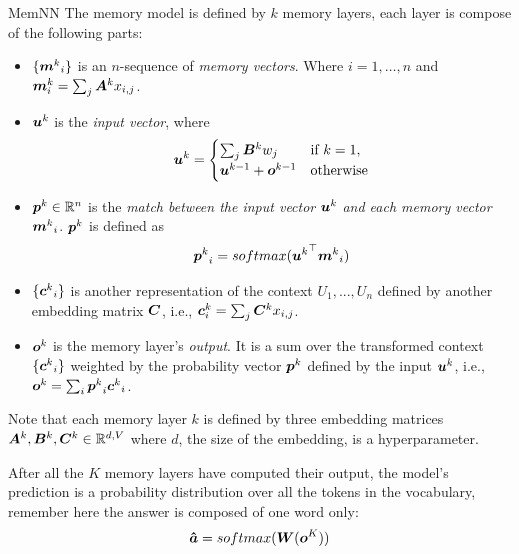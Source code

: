 \documentclass[10pt]{beamer}
\begin{document}
\begin{frame}{MemNN}
The memory model is defined by $k$ memory layers, each layer is compose of the following parts:


\begin{itemize}
\item $\{ {\bm{m}^{k}}_i\}$ is an $n$-sequence of \textit{memory vectors}. Where $i = 1, \dots, n$ and $\bm{m}^{k}_i = \sum_{j} \bm{A}^{k}x_{i,j}$.
\item  $\bm{u}^{k}$ is the \textit{input vector}, where
\begin{equation}
\bm{u}^{k}=
\begin{cases}
\sum_{j} \bm{B}^{k}w_{j} & \text{if } k=1, \\
\bm{u}^{k-1} + \bm{o}^{k-1}  & \text{otherwise}\\
\end{cases}
\end{equation}
\item $\bm{p}^{k} \in \mathbb{R}^{n}$ is the \textit{match between the input vector} $\bm{u}^{k}$ \textit{and each memory vector} ${\bm{m}^{k}}_i$. $\bm{p}^{k}$ is defined as
\begin{equation}
{\bm{p}^{k}}_i = softmax({\bm{u}^{k}}^{\top} {\bm{m}^{k}}_i) 
\end{equation}
\item $\{ {\bm{c}^{k}}_i\}$ is another representation of the context $U_1, ..., U_n$ defined by another embedding matrix $\bm{C}$, i.e., $\bm{c}^{k}_i = \sum_{j} \bm{C}^{k}x_{i,j}$.
\item $\bm{o}^{k}$ is the memory layer's  \textit{output}. It is a sum over the transformed context $\{ {\bm{c}^{k}}_i\}$ weighted by the probability vector $\bm{p}^{k}$ defined by the input $\bm{u}^{k}$, i.e.,  $\bm{o}^{k}= \sum_{i} {\bm{p}^{k}}_i {\bm{c}^{k}}_i$.
\end{itemize}

Note that each memory layer $k$ is defined by three embedding matrices $\bm{A}^{k}, \bm{B}^{k}, \bm{C}^{k} \in \mathbb{R}^{d,V}$ where $d$, the size of the embedding, is a hyperparameter.

After all the $K$ memory layers have computed their output, the model's prediction is a probability distribution over all the tokens in the vocabulary, remember here the answer is composed of one word only:
\begin{equation}
\bm{\hat{a}}= softmax(\bm{W}(\bm{o}^{K}))
\end{equation}

\end{frame}
\end{document}
